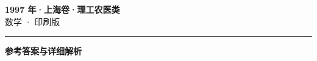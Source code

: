 \documentclass[zihao=5, a4paper]{ctexart}
\begin{document}
\begin{center}
  {\Large\bfseries 1997 年·上海卷·理工农医类}\\[4pt]
  {\large 数学 · 印刷版}
\end{center}
\medskip
{}

\par\bigskip\hrule\bigskip
{}
\begin{center}{\large\bfseries 参考答案与详细解析}\end{center}
\smallskip

\end{document}
